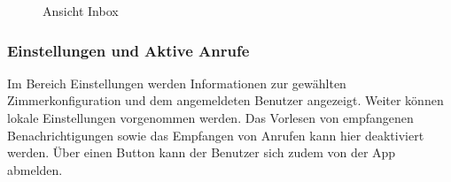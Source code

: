 \begin{figure}[h]
\begin{minipage}[b]{0.45\textwidth}
        \caption{Ansicht Inbox}
    \end{minipage}
    \label{fig:MobileClient-Screens2}
\end{figure}

\clearpage

\subsubsection*{Einstellungen und Aktive Anrufe}

Im Bereich Einstellungen werden Informationen zur gewählten Zimmerkonfiguration und dem angemeldeten Benutzer angezeigt.
Weiter können lokale Einstellungen vorgenommen werden.
Das Vorlesen von empfangenen Benachrichtigungen sowie das Empfangen von Anrufen kann hier deaktiviert werden.
Über einen Button kann der Benutzer sich zudem von der App abmelden.

